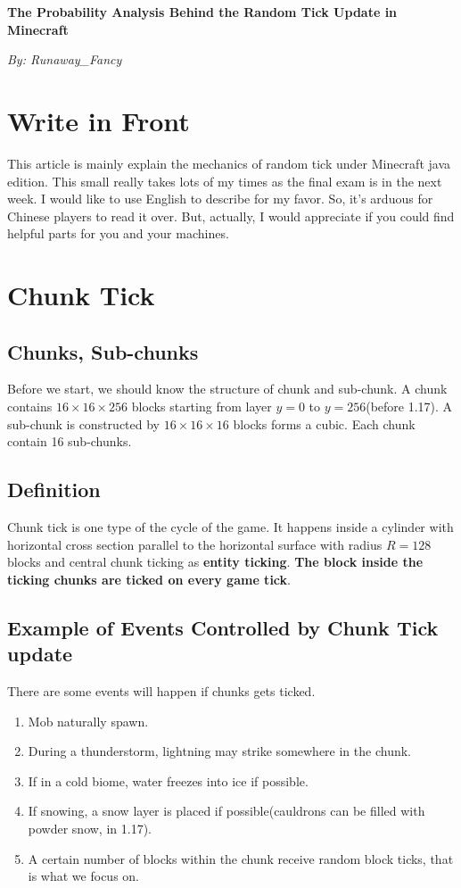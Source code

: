 \documentclass[UTF8,a4paper,15pt,titlepage,scale=0.8]{article}
\begin{document}
\begin{center}
    \large{\textbf{The Probability Analysis Behind the Random Tick Update in Minecraft}}
\end{center}
\begin{center}
    \textit{By: Runaway\_Fancy}
\end{center}

\tableofcontents
\section{Write in Front}
    This article is mainly explain the mechanics of random tick under Minecraft java edition. This small really takes lots of my times as the final exam is in the next week. I would like to use English to describe for my favor. So, it's arduous for Chinese players to read it over. But, actually, I would appreciate if you could find helpful parts for you and your machines. 
\section{Chunk Tick}
    \subsection{Chunks, Sub-chunks}
        Before we start, we should know the structure of chunk and sub-chunk. A chunk contains $16\times 16 \times 256$ blocks starting from layer $y=0$ to $y=256$(before 1.17). A sub-chunk is constructed by $16\times 16\times 16$ blocks forms a cubic. Each chunk contain 16 sub-chunks.
    \subsection{Definition}
        Chunk tick is one type of the cycle of the game. It happens inside a cylinder with horizontal cross section parallel to the horizontal surface with radius $R = 128$ blocks and central chunk ticking as \textbf{entity ticking}. \textbf{The block inside the ticking chunks are ticked on every game tick}.
    \subsection{Example of Events Controlled by Chunk Tick update}
        There are some events will happen if chunks gets ticked\cite{ref1}.
            \begin{enumerate}[$\cdot$]
                \item Mob naturally spawn.
                \item During a thunderstorm, lightning may strike somewhere in the chunk.
                \item If in a cold biome, water freezes into ice if possible.
                \item If snowing, a snow layer is placed if possible(cauldrons can be filled with powder snow, in 1.17).
                \item A certain number of blocks within the chunk receive random block ticks, that is what we focus on.
            \end{enumerate}
\end{document}
